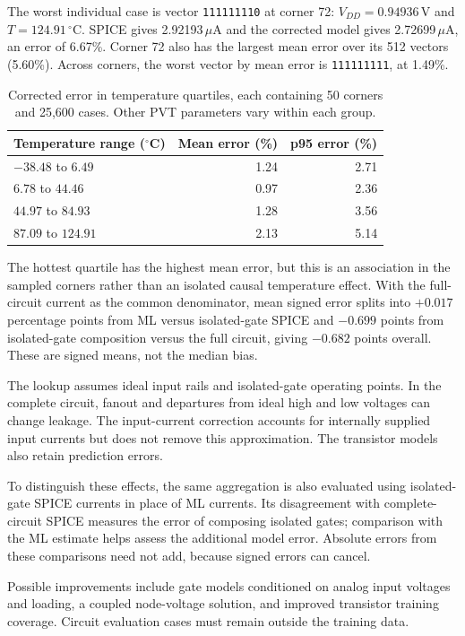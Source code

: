 The worst individual case is vector \texttt{111111110} at corner 72:
$V_{DD}=0.94936$\,V and $T=124.91\,^\circ$C. SPICE gives
2.92193\,$\mu$A and the corrected model gives 2.72699\,$\mu$A,
an error of 6.67\%. Corner 72 also has the largest mean error over its
512 vectors (5.60\%). Across corners, the worst vector by mean error is
\texttt{111111111}, at 1.49\%.

\begin{table}[H]
\centering
\begin{tabular}{lrr}
\toprule
Temperature range ($^\circ$C) & Mean error (\%) & p95 error (\%)\\
\midrule
$-38.48$ to $6.49$ & 1.24 & 2.71\\
$6.78$ to $44.46$ & 0.97 & 2.36\\
$44.97$ to $84.93$ & 1.28 & 3.56\\
$87.09$ to $124.91$ & 2.13 & 5.14\\
\bottomrule
\end{tabular}
\caption{Corrected error in temperature quartiles, each containing 50
corners and 25,600 cases. Other PVT parameters vary within each group.}
\end{table}

The hottest quartile has the highest mean error, but this is an association
in the sampled corners rather than an isolated causal temperature effect.
With the full-circuit current as the common denominator, mean signed error
splits into $+0.017$ percentage points from ML versus isolated-gate SPICE
and $-0.699$ points from isolated-gate composition versus the full circuit,
giving $-0.682$ points overall. These are signed means, not the median bias.

The lookup assumes ideal input rails and isolated-gate operating points.
In the complete circuit, fanout and departures from ideal high and low
voltages can change leakage. The input-current correction accounts for
internally supplied input currents but does not remove this approximation.
The transistor models also retain prediction errors.

To distinguish these effects, the same aggregation is also evaluated using
isolated-gate SPICE currents in place of ML currents. Its disagreement with
complete-circuit SPICE measures the error of composing isolated gates;
comparison with the ML estimate helps assess the additional model error.
Absolute errors from these comparisons need not add, because signed errors
can cancel.

Possible improvements include gate models conditioned on analog input
voltages and loading, a coupled node-voltage solution, and improved
transistor training coverage. Circuit evaluation cases must remain outside
the training data.

